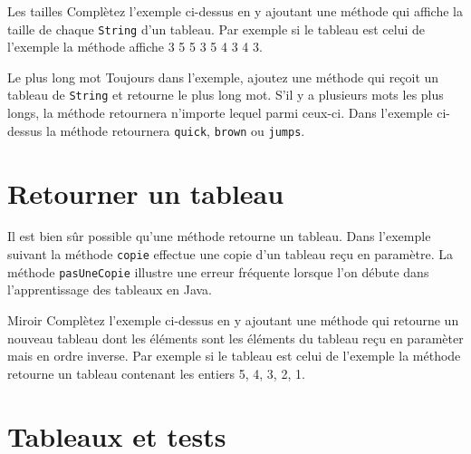 \documentclass[a4paper,11pt]{article}
\begin{document}
	\begin{Exercice}{Les tailles}	
		Complètez l'exemple ci-dessus en y ajoutant une méthode 
			qui affiche la taille de chaque \texttt{String} d'un
			 tableau. Par exemple si le tableau est celui de l'exemple la méthode 		
			 affiche 3 5 5 3 5 4 3 4 3.
	\end{Exercice}
	
	\begin{Exercice}{Le plus long mot}
		Toujours dans l'exemple, ajoutez
		 une méthode  
			qui reçoit un tableau de \texttt{String} et retourne le 
			plus long mot. S'il y a plusieurs mots les plus longs, la méthode
			retournera n'importe lequel parmi ceux-ci. 
			Dans l'exemple ci-dessus la méthode retournera
			 \texttt{quick}, \texttt{brown} ou \texttt{jumps}.
				
	\end{Exercice}
	
	


\section{Retourner un tableau}

	Il est bien sûr possible qu'une méthode retourne un tableau.
	Dans l'exemple suivant la méthode \texttt{copie} 
	effectue une copie d'un tableau reçu en paramètre. 
	La méthode \texttt{pasUneCopie} illustre une erreur fréquente
	lorsque l'on débute dans l'apprentissage des tableaux en Java.
	

	\begin{Exercice}{Miroir}	
		Complètez l'exemple ci-dessus en y ajoutant une méthode 
			qui retourne un nouveau tableau dont les éléments sont les 
			éléments du tableau reçu en paramèter mais en ordre inverse. 
			Par exemple si le tableau est celui de l'exemple la méthode 		
			 retourne un tableau contenant les entiers 5, 4, 3, 2, 1.
	\end{Exercice}



\section{Tableaux et tests}
\end{document}
